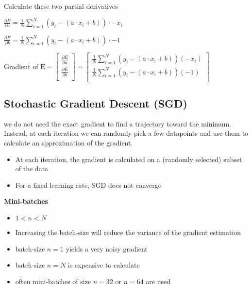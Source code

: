 Calculate these two partial derivatives

\begin{center}
    $\frac{\partial E}{\partial a} = \frac{1}{N}\sum_{i=1}^N (y_i - (a \cdot x_i + b)) \cdot -x_i$
\end{center}

\begin{center}
    $\frac{\partial E}{\partial b} = \frac{1}{N}\sum_{i=1}^N (y_i - (a \cdot x_i + b)) \cdot -1$
\end{center}

\begin{center}
    $
     \textrm{Gradient of E} = \begin{bmatrix}
                                  \frac{\partial E}{\partial a} \\
                                  \frac{\partial E}{\partial b} \\
     \end{bmatrix}
     =\begin{bmatrix}
          \frac{1}{N}\sum_{i=1}^N (y_i - (a \cdot x_i + b))(-x_i) \\
          \frac{1}{N}\sum_{i=1}^N (y_i - (a \cdot x_i + b))(-1) \\
     \end{bmatrix}
    $
\end{center}

\subsection{Stochastic Gradient Descent (SGD)}
we do not need the exact gradient to find a trajectory toward the minimum. Instead, at each iteration we can randomly pick a few datapoints and use them to calculate an approximation of the gradient.
\begin{itemize}
    \item At each iteration, the gradient is calculated on a (randomly selected) subset of the data
    \item For a fixed learning rate, SGD does not converge
\end{itemize}

\textbf{Mini-batches} \\

\begin{itemize}
    \item $1<n<N$
    \item Increasing the batch-size will reduce the variance of the gradient estimation
    \item batch-size $n=1$ yields a very noisy gradient
    \item batch-size $n=N$ is expensive to calculate
    \item often mini-batches of size $n=32$ or $n=64$ are used
\end{itemize}

